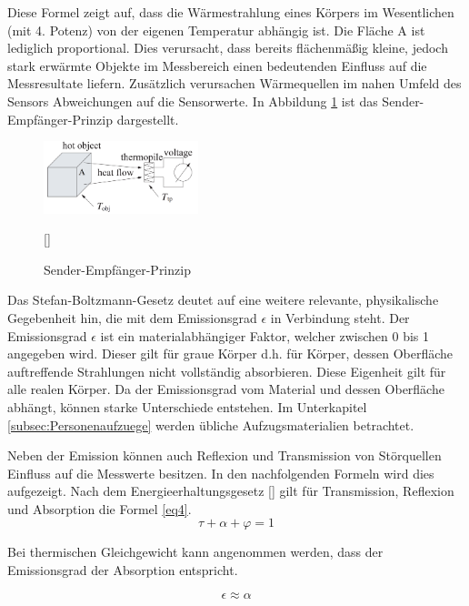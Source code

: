 Diese Formel zeigt auf, dass die Wärmestrahlung eines Körpers im Wesentlichen (mit 4. Potenz) von der eigenen Temperatur abhängig ist. 
Die Fläche A ist lediglich proportional. Dies verursacht, dass bereits flächenmäßig kleine, jedoch stark erwärmte Objekte im Messbereich einen bedeutenden Einfluss auf die Messresultate liefern. Zusätzlich verursachen Wärmequellen im nahen Umfeld des Sensors Abweichungen auf die Sensorwerte. In Abbildung \ref{fig:thermosäule} ist das Sender-Empfänger-Prinzip dargestellt.

\begin{figure}[H]
	\centering
	\includegraphics[width=0.4\textwidth]
	{fig/seebeck2.PNG}
	\caption[Sender-Empfänger-Prinzip]{Sender-Empfänger-Prinzip} [\protect\cite{seebeck}]
	\label{fig:thermosäule}
\end{figure}


Das Stefan-Boltzmann-Gesetz deutet auf eine weitere relevante, physikalische Gegebenheit hin, die mit dem Emissionsgrad $\epsilon$  in Verbindung steht.
 Der Emissionsgrad $\epsilon$ ist ein materialabhängiger Faktor, welcher zwischen 0 bis 1  angegeben wird. Dieser gilt für graue Körper d.h. für Körper, dessen Oberfläche auftreffende Strahlungen nicht vollständig absorbieren. Diese Eigenheit gilt für alle realen Körper. Da der Emissionsgrad vom Material und dessen Oberfläche abhängt, können starke Unterschiede entstehen. Im Unterkapitel \ref{subsec:Personenaufzuege} werden übliche Aufzugsmaterialien betrachtet.

Neben der Emission können auch Reflexion und Transmission von Störquellen Einfluss auf die Messwerte besitzen. In den nachfolgenden Formeln wird dies aufgezeigt. Nach dem Energieerhaltungsgesetz [\protect\cite{Thermoformeln}] gilt für Transmission, Reflexion und Absorption die Formel \ref{eq4}.
\begin{equation}
\label{eq4}
\tau  + \alpha + \varphi  = 1
\end{equation}

Bei thermischen Gleichgewicht kann angenommen werden, dass der Emissionsgrad der Absorption entspricht.

\begin{equation}
\label{eq5}
\epsilon \approx  \alpha
\end{equation}

